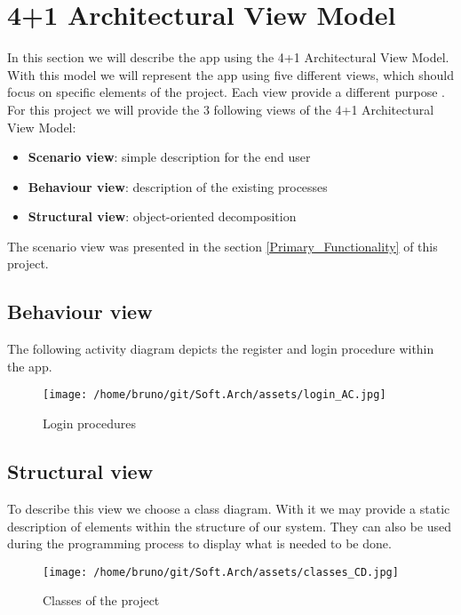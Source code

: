 \section{4+1 Architectural View Model}


In this section we will describe the \gls{app} using the 4+1 Architectural View Model. With this model we will represent
the \gls{app} using five different views, which should focus on specific elements of the project. Each view provide
a different purpose \cite{refart:KR41}. For this project we will provide the 3 following views of the 4+1 Architectural View 
Model:

\begin{itemize}
    \item \textbf{Scenario view}: simple description for the end user 
    \item \textbf{Behaviour view}: description of the existing processes
    \item \textbf{Structural view}: object-oriented decomposition
\end{itemize}

The scenario view was presented in the section \ref{Primary_Functionality} of this project.

\newpage
\subsection{Behaviour view}
The following \gls{activity diagram} depicts the register and login procedure within the app.

\begin{figure}[H]
    \centering
    \texttt{[image: /home/bruno/git/Soft.Arch/assets/login\_AC.jpg]}
    \caption{Login procedures}
    \label{fig:login_register}
\end{figure}

\newpage
\subsection{Structural view}
To describe this view we choose a \gls{class diagram}. With it we may provide a static description of elements
within the structure of our system. They can also be used during the programming process to display what is needed
to be done.

\begin{figure}[H]
    \centering
    \texttt{[image: /home/bruno/git/Soft.Arch/assets/classes\_CD.jpg]}
    \caption{Classes of the project}
    \label{fig:class_CD}
\end{figure}
 


